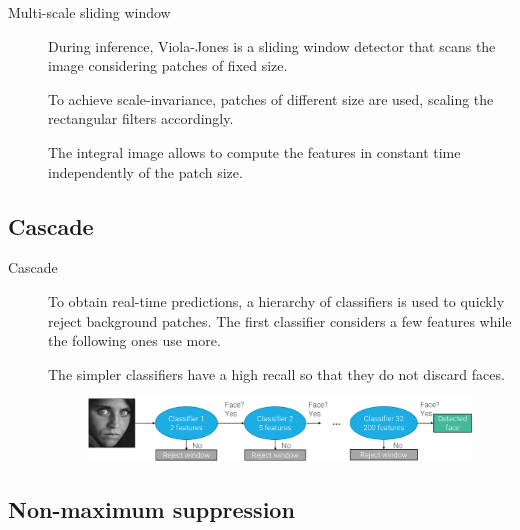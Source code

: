 \begin{description}
    \item[Multi-scale sliding window] 
        During inference, Viola-Jones is a sliding window detector that scans the image considering patches of fixed size.

        To achieve scale-invariance, patches of different size are used, scaling the rectangular filters accordingly.

        \begin{remark}
            The integral image allows to compute the features in constant time independently of the patch size.
        \end{remark}
\end{description}


\subsection{Cascade}

\begin{description}
    \item[Cascade] 
        To obtain real-time predictions, a hierarchy of classifiers is used to quickly reject background patches. The first classifier considers a few features while the following ones use more.

        \begin{remark}
            The simpler classifiers have a high recall so that they do not discard faces.
        \end{remark}

        \begin{figure}[H]
            \centering
            \includegraphics[width=0.8\linewidth]{./img/_viola_jones_cascade.pdf}
        \end{figure}
\end{description}


\subsection{Non-maximum suppression}

